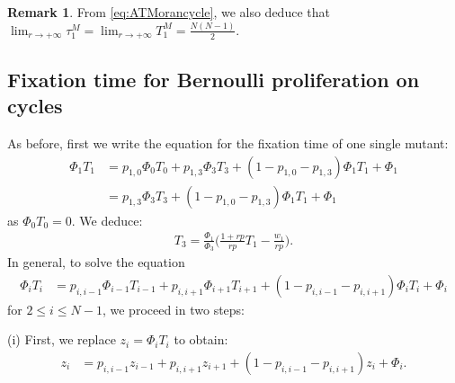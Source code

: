 \documentclass[a4paper,english,10pt]{amsart}
\theoremstyle{definition}
\newtheorem{remark}{Remark}
\numberwithin{equation}{section}
\begin{document}
\begin{remark} \label{rem:redcycle}
From \eqref{eq:ATMorancycle}, we also deduce that $\lim_{r \to +\infty} \tau_1^M = \lim_{r \to +\infty} T_1^M = \frac{N(N-1)}{2}$.
\end{remark}

\subsection{Fixation time for Bernoulli proliferation on cycles}
As before, first we write the equation for the fixation time of one single mutant: 
  \begin{align}  \label{eq:TF_eq_cycle1}
    \Phi_1 T_1  & = p_{1,0} \Phi_{0} T_{0} + p_{1,3} \Phi_3 T_3 + (1 -  p_{1,0} -  p_{1,3}) \Phi_1 T_1 + \Phi_1 \\
      &= p_{1,3} \Phi_3 T_3 + (1 -  p_{1,0} -  p_{1,3}) \Phi_1 T_1 + \Phi_1 \nonumber
  \end{align}
as $\Phi_0T_0 = 0$. We deduce: 
\begin{align} \label{eq:TF3cycle}
T_3  =   \frac{\Phi_1}{\Phi_3} \big( \frac{1+rp}{rp} T_1 - \frac{w_1}{rp}\big). 
\end{align}
In general, to solve the equation 
\begin{align} \label{eq:TFcycle}
\Phi_i T_i  & = p_{i,i-1} \Phi_{i-1} T_{i-1} + p_{i,i+1} \Phi_{i+1} T_{i+1} + (1 -  p_{i,i-1} -  p_{i,i+1}) \Phi_i T_i  + \Phi_i
\end{align}
for $2 \leq i \leq N-1$, we proceed in two steps: 
\smallskip 

\noindent
(i) First, we replace $z_i = \Phi_iT_i$ to obtain: 
\begin{align} \label{eq:TFsimplecycle1}
z_i & = p_{i,i-1} z_{i-1} + p_{i,i+1} z_{i+1} + (1 -  p_{i,i-1} -  p_{i,i+1}) z_i  + \Phi_i.
\end{align}
\end{document}
